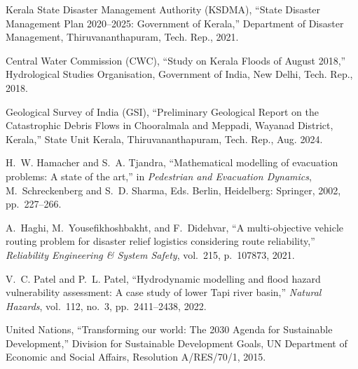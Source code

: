 \documentclass[12pt,oneside]{report}
\begin{document}
\begin{enumerate}[label={[\arabic*]},leftmargin=2.5em,itemsep=8pt]
    \item Kerala State Disaster Management Authority (KSDMA), ``State Disaster Management Plan 2020--2025: Government of Kerala,'' Department of Disaster Management, Thiruvananthapuram, Tech. Rep., 2021.
    
    \item Central Water Commission (CWC), ``Study on Kerala Floods of August 2018,'' Hydrological Studies Organisation, Government of India, New Delhi, Tech. Rep., 2018.
    
    \item Geological Survey of India (GSI), ``Preliminary Geological Report on the Catastrophic Debris Flows in Chooralmala and Meppadi, Wayanad District, Kerala,'' State Unit Kerala, Thiruvananthapuram, Tech. Rep., Aug. 2024.
    
    \item H.~W. Hamacher and S.~A. Tjandra, ``Mathematical modelling of evacuation problems: A state of the art,'' in \emph{Pedestrian and Evacuation Dynamics}, M.~Schreckenberg and S.~D. Sharma, Eds. Berlin, Heidelberg: Springer, 2002, pp.~227--266.
    
    \item A.~Haghi, M.~Yousefikhoshbakht, and F.~Didehvar, ``A multi-objective vehicle routing problem for disaster relief logistics considering route reliability,'' \emph{Reliability Engineering \& System Safety}, vol.~215, p.~107873, 2021.
    
    \item V.~C. Patel and P.~L. Patel, ``Hydrodynamic modelling and flood hazard vulnerability assessment: A case study of lower Tapi river basin,'' \emph{Natural Hazards}, vol.~112, no.~3, pp.~2411--2438, 2022.
    
    \item United Nations, ``Transforming our world: The 2030 Agenda for Sustainable Development,'' Division for Sustainable Development Goals, UN Department of Economic and Social Affairs, Resolution A/RES/70/1, 2015.
\end{enumerate}
\end{document}
